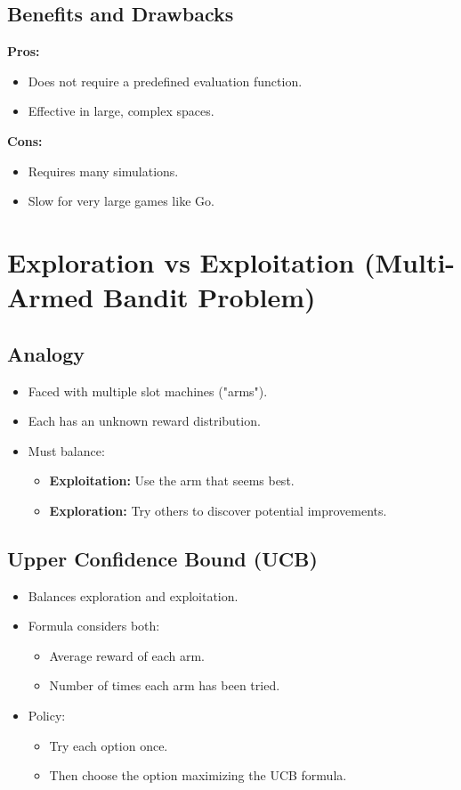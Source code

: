 \subsection{Benefits and Drawbacks}
\textbf{Pros:}
\begin{itemize}
    \item Does not require a predefined evaluation function.
    \item Effective in large, complex spaces.
\end{itemize}
\textbf{Cons:}
\begin{itemize}
    \item Requires many simulations.
    \item Slow for very large games like Go.
\end{itemize}

\section{Exploration vs Exploitation (Multi-Armed Bandit Problem)}

\subsection{Analogy}
\begin{itemize}
    \item Faced with multiple slot machines ("arms").
    \item Each has an unknown reward distribution.
    \item Must balance:
    \begin{itemize}
        \item \textbf{Exploitation:} Use the arm that seems best.
        \item \textbf{Exploration:} Try others to discover potential improvements.
    \end{itemize}
\end{itemize}

\subsection{Upper Confidence Bound (UCB)}
\begin{itemize}
    \item Balances exploration and exploitation.
    \item Formula considers both:
    \begin{itemize}
        \item Average reward of each arm.
        \item Number of times each arm has been tried.
    \end{itemize}
    \item Policy:
    \begin{itemize}
        \item Try each option once.
        \item Then choose the option maximizing the UCB formula.
    \end{itemize}
\end{itemize}

